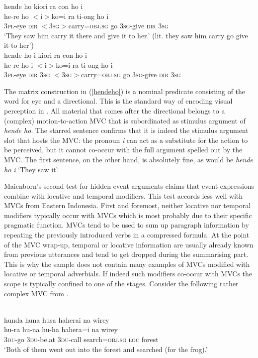 \ea \label{hendeho}
\ea
\glll hende ho kiori ra con ho i \\
he-re ho $<$i$>$ko=i ra ti-ong ho i \\
3\textsc{pl}-eye \textsc{dir} $<$3\textsc{sg}$>$carry=\textsc{obj}.\textsc{sg} go 3\textsc{sg}-give \textsc{dir} 3\textsc{sg}\\
\glft `They saw him carry it there and give it to her.' (lit. they saw him carry go give it to her')\\
\ex
\glll *hende ho i kiori ra con ho i\\
he-re ho i $<$i$>$ko=i ra ti-ong ho i \\
3\textsc{pl}-eye \textsc{dir} 3\textsc{sg} $<$3\textsc{sg}$>$carry=\textsc{obj}.\textsc{sg} go 3\textsc{sg}-give \textsc{dir} 3\textsc{sg}\\
\z
\z

The matrix construction in (\ref{hendeho}) is a nominal predicate consisting of the word for eye and a directional. This is the standard way of encoding visual perception in . All material that comes after the directional belongs to a (complex) motion-to-action MVC that is subordinated as stimulus argument of \textit{hende ho}. The starred sentence confirms that it is indeed the stimulus argument slot that hosts the MVC: the pronoun \textit{i} can act as a substitute for the action to be perceived, but it cannot co-occur with the full argument spelled out by the MVC. The first sentence, on the other hand, is absolutely fine, as would be \textit{hende ho i} `They saw it'.

Maienborn's second test for hidden event arguments claims that event expressions combine with locative and temporal modifiers. This test accords less well with MVCs from Eastern Indonesia. First and foremost, neither locative nor temporal modifiers typically occur with MVCs which is most probably due to their specific pragmatic function. MVCs tend to be used to sum up paragraph information by repeating the previously introduced verbs in a compressed formula. At the point of the MVC wrap-up, temporal or locative information are usually already known from previous utterances and tend to get dropped during the summarising part. This is why the sample does not contain many examples of MVCs modified with locative or temporal adverbials. If indeed such modifiers co-occur with MVCs the scope is typically confined to one of the stages. Consider the following rather complex MVC from .

\ea  
{}\\
\glll hunda huna husa haherai na wirey \\
hu-ra hu-na hu-ha hahera=i na wirey \\
3\textsc{du}-go 3\textsc{du}-be.at 3\textsc{du}-call search=\textsc{obj}.\textsc{sg} \textsc{loc} forest\\
\glft `Both of them went out into the forest and searched (for the frog).' \\
\z

